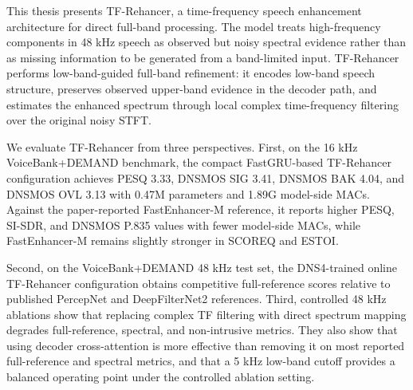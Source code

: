 This thesis presents TF-Rehancer, a time-frequency speech enhancement architecture for direct full-band processing. The model treats high-frequency components in 48 kHz speech as observed but noisy spectral evidence rather than as missing information to be generated from a band-limited input. TF-Rehancer performs low-band-guided full-band refinement: it encodes low-band speech structure, preserves observed upper-band evidence in the decoder path, and estimates the enhanced spectrum through local complex time-frequency filtering over the original noisy STFT.

We evaluate TF-Rehancer from three perspectives. First, on the 16 kHz VoiceBank+\allowbreak DEMAND benchmark, the compact FastGRU-based TF-Rehancer configuration achieves PESQ 3.33, DNSMOS SIG 3.41, DNSMOS BAK 4.04, and DNSMOS OVL 3.13 with 0.47M parameters and 1.89G model-side MACs. Against the paper-reported FastEnhancer-M reference, it reports higher PESQ, SI-SDR, and DNSMOS P.835 values with fewer model-side MACs, while FastEnhancer-M remains slightly stronger in SCOREQ and ESTOI.

Second, on the VoiceBank+\allowbreak DEMAND 48 kHz test set, the DNS4-trained online TF-Rehancer configuration obtains competitive full-reference scores relative to published PercepNet and DeepFilterNet2 references. Third, controlled 48 kHz ablations show that replacing complex TF filtering with direct spectrum mapping degrades full-reference, spectral, and non-intrusive metrics. They also show that using decoder cross-attention is more effective than removing it on most reported full-reference and spectral metrics, and that a 5 kHz low-band cutoff provides a balanced operating point under the controlled ablation setting.
